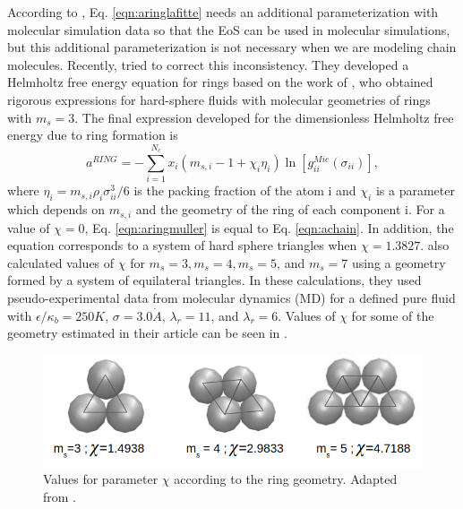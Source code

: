 According to , Eq. \eqref{eqn:aringlafitte} needs an additional parameterization with molecular simulation data so that the EoS can  be used in molecular simulations, but this additional parameterization is not necessary when we are modeling chain molecules. Recently,  tried to correct this inconsistency. They developed a Helmholtz free energy equation for rings based on the work of , who obtained rigorous expressions for hard-sphere fluids with molecular geometries of rings with $m_s=3$. The final expression developed for the dimensionless Helmholtz free energy due to ring formation is
\begin{equation}
a^{RING} =-\sum_{i=1}^{N_{c}} x_{i}\left (m_{s,i}-1+\chi_{i}\eta_{i} \right )\ln \left [g_{ii}^{Mie}(\sigma_{ii}) \right] ,
\label{eqn:aringmuller}
\end{equation}
where $\eta_{i}=m_{s,i}\rho_{i}\sigma_{ii}^{3}/6$ is the packing fraction of the atom i and $\chi_{i}$ is a parameter which depends on $m_{s,i}$ and the geometry of the ring of each component i. For a value of $\chi=0$, Eq. \eqref{eqn:aringmuller} is equal to Eq. \eqref{eqn:achain}. In addition, the equation corresponds to a system of hard sphere triangles when $\chi=1.3827$.  also calculated values of $\chi$ for $m_{s}=3,m_{s}=4,m_{s}=5$, and $m_{s}=7$ using a geometry formed by a system of equilateral triangles. In these calculations, they used pseudo-experimental data from molecular dynamics (MD) for a defined pure fluid with $\epsilon/\kappa_{b} = 250 K$, $\sigma = 3.0 \dot{A}$, $\lambda_{r} = 11$, and $\lambda_{r} = 6$. Values of $\chi$  for some of the geometry estimated in their article can be seen in .

\begin{figure}[th]
	\centering
	\includegraphics[scale=0.5]{Figures/mullercomtrian}
	\caption{Values for parameter $\chi$ according to the ring geometry. Adapted from .}
	\label{ringqsi}
\end{figure}

